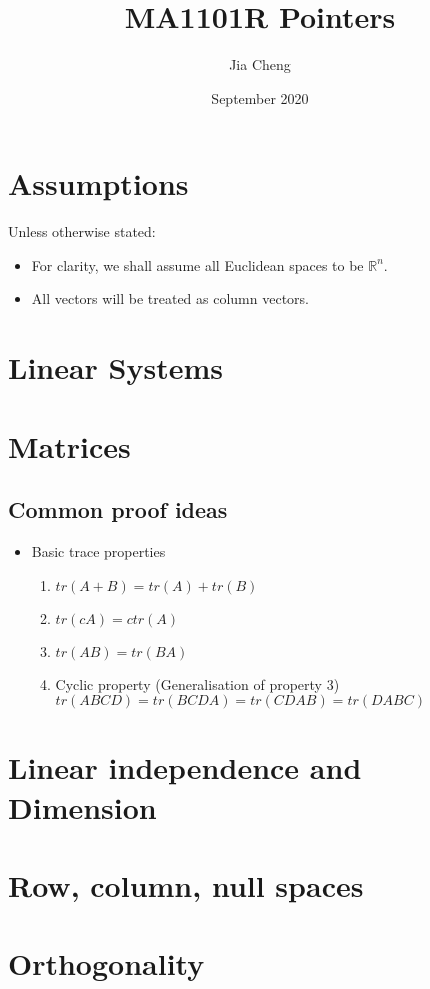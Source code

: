 \documentclass{article}
\title{MA1101R Pointers}
\author{Jia Cheng}
\date{September 2020}
\begin{document}
\maketitle

\section{Assumptions}
Unless otherwise stated:
\begin{itemize}
	\item For clarity, we shall assume all Euclidean spaces to be $\mathbb{R}^n$.
	\item All vectors will be treated as column vectors.
\end{itemize}


\section{Linear Systems}

\section{Matrices}
\subsection{Common proof ideas}
\begin{itemize}
	\item Basic trace properties
	\begin{enumerate}
		\item $tr(A + B) = tr(A) + tr(B)$
		\item $tr(cA) = ctr(A)$
		\item $tr(AB) = tr(BA)$
		\item Cyclic property (Generalisation of property 3)\\
		$tr(ABCD) = tr(BCDA) = tr(CDAB) = tr(DABC)$
	\end{enumerate}
\end{itemize}

\section{Linear independence and Dimension}

\section{Row, column, null spaces}

\section{Orthogonality}
\end{document}
